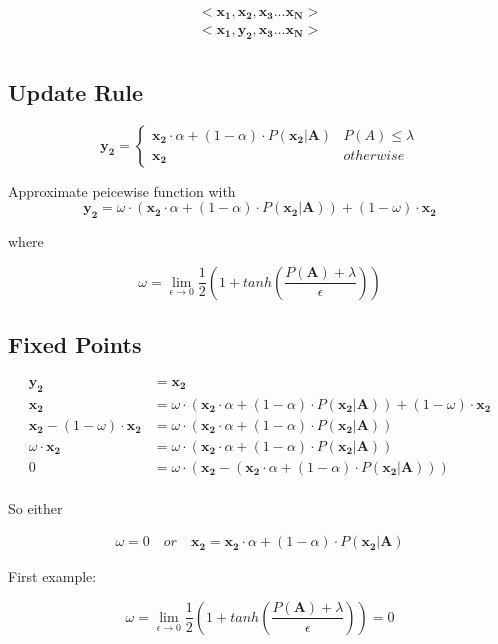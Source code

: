 

\begin{align*}
    <\mathbf{x_1, x_2, x_3 ... x_N}> \\
    <\mathbf{x_1, y_2, x_3 ... x_N}> \\
\end{align*}

\subsection*{Update Rule}


\[ \mathbf{y_2} =  \begin{cases} 
      \mathbf{x_2} \cdot \alpha + (1 - \alpha) \cdot P( \mathbf{x_2} | \mathbf{A}) & P(A) \leq \lambda \\
      \mathbf{x_2} & otherwise 
   \end{cases}
\]

Approximate peicewise function with 
\begin{equation*}
    \mathbf{y_2} = \omega \cdot (\mathbf{x_2} \cdot \alpha + (1 - \alpha) \cdot P( \mathbf{x_2} | \mathbf{A})) + (1 - \omega) \cdot \mathbf{x_2}
\end{equation*}

where 

\begin{equation*}
    \omega =  \lim_{\epsilon \to 0}  \frac{1}{2} \left( 1 + tanh \left( \frac{P(\mathbf{A}) + \lambda}{\epsilon}  \right) \right)
\end{equation*}

\subsection*{Fixed Points}

\begin{align*}
    \mathbf{y_2} &= \mathbf{x_2}\\
    \mathbf{x_2} &= \omega \cdot (\mathbf{x_2} \cdot \alpha + (1 - \alpha) \cdot P( \mathbf{x_2} | \mathbf{A})) + (1 - \omega) \cdot \mathbf{x_2}\\
    \mathbf{x_2} - (1 - \omega) \cdot \mathbf{x_2} &= \omega \cdot (\mathbf{x_2} \cdot \alpha + (1 - \alpha) \cdot P( \mathbf{x_2} | \mathbf{A}))\\
    \omega \cdot \mathbf{x_2} &= \omega \cdot (\mathbf{x_2} \cdot \alpha + (1 - \alpha) \cdot P( \mathbf{x_2} | \mathbf{A}))\\
    0 &= \omega \cdot (\mathbf{x_2} - (\mathbf{x_2} \cdot \alpha + (1 - \alpha) \cdot P( \mathbf{x_2} | \mathbf{A}))) \\
\end{align*}

So either

\begin{align*}
    \omega = 0 \quad or \quad \mathbf{x_2} = \mathbf{x_2} \cdot \alpha + (1 - \alpha) \cdot P( \mathbf{x_2} | \mathbf{A})
\end{align*}

First example:

\begin{equation*}
    \omega =  \lim_{\epsilon \to 0}  \frac{1}{2} \left( 1 + tanh \left( \frac{P(\mathbf{A}) + \lambda}{\epsilon}  \right) \right) = 0
\end{equation*}